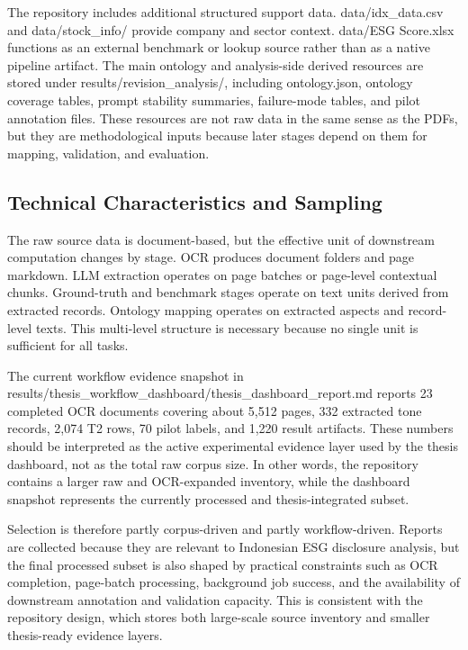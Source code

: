 The repository includes additional structured support data. data/idx\_data.csv and data/stock\_info/ provide company and sector context. data/ESG Score.xlsx functions as an external benchmark or lookup source rather than as a native pipeline artifact. The main ontology and analysis-side derived resources are stored under results/revision\_analysis/, including ontology.json, ontology coverage tables, prompt stability summaries, failure-mode tables, and pilot annotation files. These resources are not raw data in the same sense as the PDFs, but they are methodological inputs because later stages depend on them for mapping, validation, and evaluation.

\subsection{Technical Characteristics and Sampling}

The raw source data is document-based, but the effective unit of downstream computation changes by stage. OCR produces document folders and page markdown. LLM extraction operates on page batches or page-level contextual chunks. Ground-truth and benchmark stages operate on text units derived from extracted records. Ontology mapping operates on extracted aspects and record-level texts. This multi-level structure is necessary because no single unit is sufficient for all tasks.

The current workflow evidence snapshot in results/thesis\_workflow\_dashboard/thesis\_dashboard\_report.md reports 23 completed OCR documents covering about 5,512 pages, 332 extracted tone records, 2,074 T2 rows, 70 pilot labels, and 1,220 result artifacts. These numbers should be interpreted as the active experimental evidence layer used by the thesis dashboard, not as the total raw corpus size. In other words, the repository contains a larger raw and OCR-expanded inventory, while the dashboard snapshot represents the currently processed and thesis-integrated subset.

Selection is therefore partly corpus-driven and partly workflow-driven. Reports are collected because they are relevant to Indonesian ESG disclosure analysis, but the final processed subset is also shaped by practical constraints such as OCR completion, page-batch processing, background job success, and the availability of downstream annotation and validation capacity. This is consistent with the repository design, which stores both large-scale source inventory and smaller thesis-ready evidence layers.

